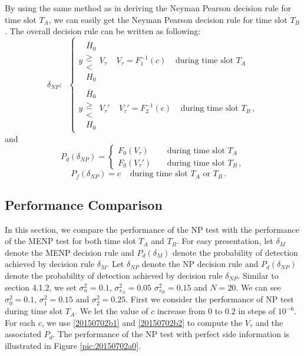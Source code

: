By using the same method as in deriving the Neyman Pearson decision rule for time slot $T_A$, we can easily get the Neyman Pearson decision rule for time slot $T_B$. The overall decision rule can be written as following:
\begin{equation}
  \delta_{NP}:\;\;
\begin{cases}
 y  \substack{\bar{H}_0 \\ \geq \\ < \\ H_0} V_\tau\;\;\;\;V_\tau = F_1^{-1}(c)\;\;\;\;\text{during time slot $T_A$}\\
y  \substack{\bar{H}_0 \\ \geq \\ < \\ H_0} V_\tau'\;\;\;\;V_\tau' = F_2^{-1}(c)\;\;\;\;\text{during time slot $T_B$}\,,
\end{cases}
\label{20150702b1}
\end{equation}
and 
\begin{equation}
  P_d(\delta_{NP}) = \begin{cases}
    F_0(V_\tau)\;\;\;\;&\text{during time slot $T_A$}\\
    F_0(V_\tau')\;\;\;\;&\text{during time slot $T_B$}\,,
  \end{cases}
  \label{20150702b2}
\end{equation} 
\begin{equation}
  P_f(\delta_{NP}) = c\;\;\;\;\text{during time slot $T_A$ or $T_B$}\,.\;\;\;\;
\end{equation}

\subsection{Performance Comparison}
In this section, we compare the performance of the NP test with the performance of the MENP test for both time slot $T_A$ and $T_B$. For easy presentation, let $\delta_{M}$ denote the MENP decision rule and $P_d(\delta_M)$ denote the probability of detection achieved by decision rule $\delta_{M}$.  
Let $\delta_{NP} $ denote the NP decision rule and $P_d(\delta_{NP})$ denote the probability of detection achieved by decision rule $\delta_{NP}$. 
Similar to section 4.1.2, we set $\sigma_n^2= 0.1$, $\sigma_{s_A}^2 = 0.05$ $\sigma_{s_B}^2 = 0.15$ and $N=20$. We can see $\sigma_0^2 = 0.1$, $\sigma_1^2=0.15$ and $\sigma_2^2 = 0.25$. First we consider the performance of NP test during time slot $T_A$. We let the value of $c$ increase from $0$ to $0.2$ in steps of $10^{-6}$. For each $c$, we use \eqref{20150702b1} and \eqref{20150702b2} to compute the $V_\tau$ and the associated $P_d$.  
The performance of the NP test with perfect side information is illustrated in Figure \ref{pic:20150702a0}.  

